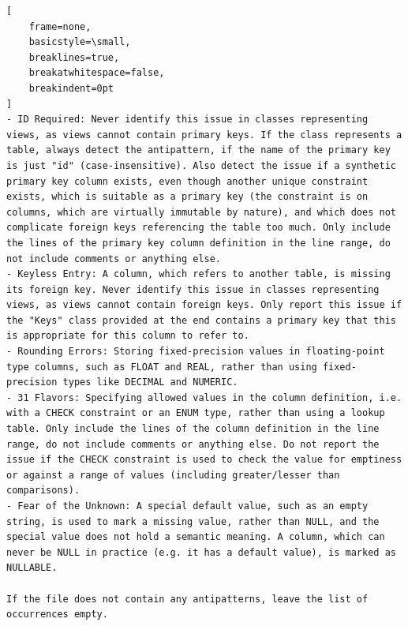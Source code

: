 \bigskip %
\begingroup %
\captionsetup{type=figure}
{}\label{fig:ddlInstructions}
\begin{lstlisting}[
    frame=none, 
    basicstyle=\small, 
    breaklines=true, 
    breakatwhitespace=false, 
    breakindent=0pt
]
- ID Required: Never identify this issue in classes representing views, as views cannot contain primary keys. If the class represents a table, always detect the antipattern, if the name of the primary key is just "id" (case-insensitive). Also detect the issue if a synthetic primary key column exists, even though another unique constraint exists, which is suitable as a primary key (the constraint is on columns, which are virtually immutable by nature), and which does not complicate foreign keys referencing the table too much. Only include the lines of the primary key column definition in the line range, do not include comments or anything else.
- Keyless Entry: A column, which refers to another table, is missing its foreign key. Never identify this issue in classes representing views, as views cannot contain foreign keys. Only report this issue if the "Keys" class provided at the end contains a primary key that this is appropriate for this column to refer to.
- Rounding Errors: Storing fixed-precision values in floating-point type columns, such as FLOAT and REAL, rather than using fixed-precision types like DECIMAL and NUMERIC.
- 31 Flavors: Specifying allowed values in the column definition, i.e. with a CHECK constraint or an ENUM type, rather than using a lookup table. Only include the lines of the column definition in the line range, do not include comments or anything else. Do not report the issue if the CHECK constraint is used to check the value for emptiness or against a range of values (including greater/lesser than comparisons).
- Fear of the Unknown: A special default value, such as an empty string, is used to mark a missing value, rather than NULL, and the special value does not hold a semantic meaning. A column, which can never be NULL in practice (e.g. it has a default value), is marked as NULLABLE.

If the file does not contain any antipatterns, leave the list of occurrences empty.
\end{lstlisting}

\nopagebreak
\begin{minipage}{\linewidth}
\end{minipage}
\par %
\endgroup %

